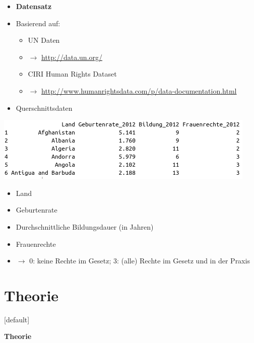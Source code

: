 \documentclass[aspectratio=169, journal, x11names, unknownkeysallowed, hyperref={colorlinks,
linkcolor = SS2,
urlcolor  = F3,
citecolor = F3,
anchorcolor = A4}, 12pt]{beamer}
\newcommand{\oarrow}{\textcolor{A1}{$\rightarrow$} }
\begin{document}
    \begin{frame}[t]
      \begin{minipage}[t]{0.5\textwidth}
        \vspace{-2.5em}
        \begin{itemize}
            \item[] \textbf{Datensatz}
            \item Basierend auf:
            \begin{itemize}
              \item UN Daten
              \item[] \oarrow \url{http://data.un.org/} 
              \item CIRI Human Rights Dataset 
              \item[] \oarrow \url{http://www.humanrightsdata.com/p/data-documentation.html}
            \end{itemize}
            \item Querschnittsdaten
        \end{itemize}
      \end{minipage}%
      \begin{minipage}[t]{0.5\textwidth}
        \centering
        \includegraphics[scale=0.4]{../Plots/data_head.png}
        \begin{itemize}
          \item Land
          \item Geburtenrate
          \item Durchschnittliche Bildungsdauer (in Jahren)
          \item Frauenrechte
          \item[] \oarrow 0: keine Rechte im Gesetz; 3: (alle) Rechte im Gesetz und in der Praxis
        \end{itemize}
      \end{minipage}
    \end{frame}

\section{Theorie}
[default]
\thispagestyle{empty}
\begin{frame} 
\begin{center}
\textcolor{SS2}{\huge{\textbf{Theorie}}}
\end{center}
\end{frame}
\end{document}
